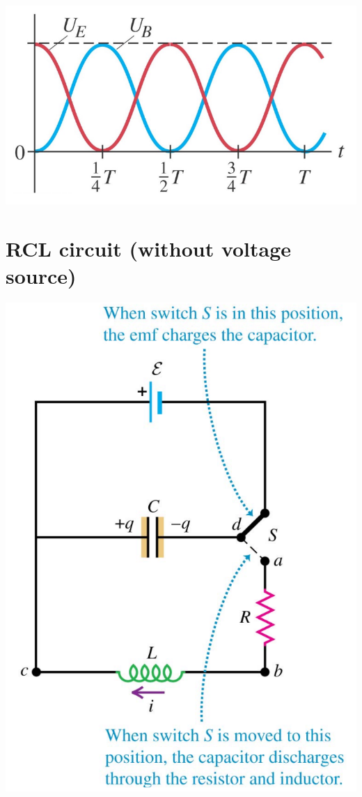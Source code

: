 \documentclass[11pt]{article}
\begin{document}
\begin{center}
\includegraphics[scale=0.6]{./images/lc-circuit-energy.png}
\end{center}
\section{RCL circuit (without voltage source)}
\label{sec:org6c62c59}

\begin{center}
\includegraphics[scale=0.52]{./images/rcl-circuit.png}
\end{center}
\end{document}

